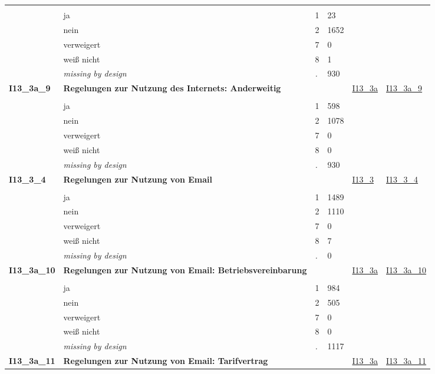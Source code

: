 \begin{longtable}{| L{2.45cm} | L{6cm} | C{1.5cm} | R{1cm} | C{2.25cm} | C{2.25cm} |}
   &  &  &  &  &  \\ 
   & ja & 1 & 23 &  &  \\ 
   & nein & 2 & 1652 &  &  \\ 
   & verweigert & 7 & 0 &  &  \\ 
   & weiß nicht & 8 & 1 &  &  \\ 
   & \textit{missing by design} & \textit{.} & 930 &  &  \\ 
   \midrule
\textbf{I13\_3a\_9}\label{var:I13:3a:9} & \textbf{Regelungen zur Nutzung des Internets: Anderweitig} &  &  & \hyperref[I13:3a]{I13\_3a} & \hyperref[var:suf:I13:3a:9]{I13\_3a\_9} \\ 
   &  &  &  &  &  \\ 
   & ja & 1 & 598 &  &  \\ 
   & nein & 2 & 1078 &  &  \\ 
   & verweigert & 7 & 0 &  &  \\ 
   & weiß nicht & 8 & 0 &  &  \\ 
   & \textit{missing by design} & \textit{.} & 930 &  &  \\ 
   \midrule
\textbf{I13\_3\_4}\label{var:I13:3:4} & \textbf{Regelungen zur Nutzung von Email} &  &  & \hyperref[I13:3]{I13\_3} & \hyperref[var:suf:I13:3:4]{I13\_3\_4} \\ 
   &  &  &  &  &  \\ 
   & ja & 1 & 1489 &  &  \\ 
   & nein & 2 & 1110 &  &  \\ 
   & verweigert & 7 & 0 &  &  \\ 
   & weiß nicht & 8 & 7 &  &  \\ 
   & \textit{missing by design} & \textit{.} & 0 &  &  \\ 
   \midrule
\textbf{I13\_3a\_10}\label{var:I13:3a:10} & \textbf{Regelungen zur Nutzung von Email: Betriebsvereinbarung} &  &  & \hyperref[I13:3a]{I13\_3a} & \hyperref[var:suf:I13:3a:10]{I13\_3a\_10} \\ 
   &  &  &  &  &  \\ 
   & ja & 1 & 984 &  &  \\ 
   & nein & 2 & 505 &  &  \\ 
   & verweigert & 7 & 0 &  &  \\ 
   & weiß nicht & 8 & 0 &  &  \\ 
   & \textit{missing by design} & \textit{.} & 1117 &  &  \\ 
   \midrule
\textbf{I13\_3a\_11}\label{var:I13:3a:11} & \textbf{Regelungen zur Nutzung von Email: Tarifvertrag} &  &  & \hyperref[I13:3a]{I13\_3a} & \hyperref[var:suf:I13:3a:11]{I13\_3a\_11} \\ 

\end{longtable}
